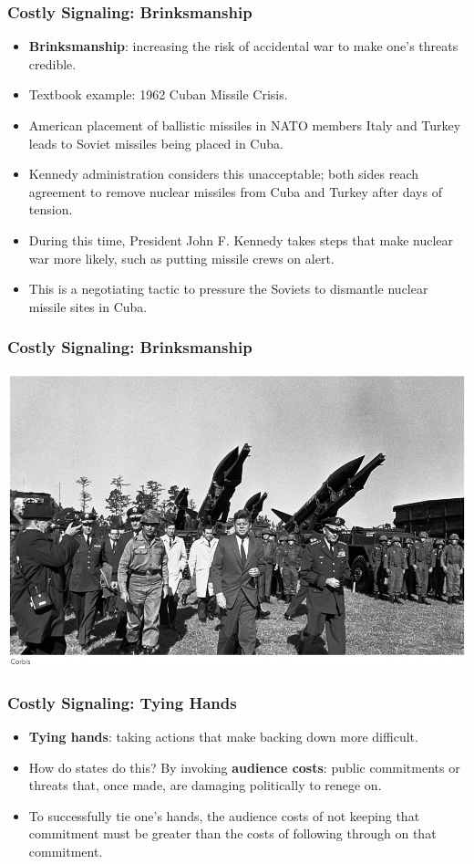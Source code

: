 \documentclass[handout]{beamer}
\begin{document}
\begin{frame} 
\frametitle{\LARGE{Costly Signaling: Brinksmanship}}
\begin{itemize}
	\item \textbf{Brinksmanship}: increasing the risk of accidental war to make one's threats credible. \pause 
	\item Textbook example: 1962 Cuban Missile Crisis. \pause
	\item American placement of ballistic missiles in NATO members Italy and Turkey leads to Soviet missiles being placed in Cuba. \pause
	\item Kennedy administration considers this unacceptable; both sides reach agreement to remove nuclear missiles from Cuba and Turkey after days of tension. \pause
	\item During this time, President John F. Kennedy takes steps that make nuclear war more likely, such as putting missile crews on alert. \pause
	\item This is a negotiating tactic to pressure the Soviets to dismantle nuclear missile sites in Cuba. 
\end{itemize}
\end{frame}

\begin{frame}
	\frametitle{\LARGE{Costly Signaling: Brinksmanship}}
	\centering
	\includegraphics[width=\textwidth,height=0.8\textheight,keepaspectratio]{Cubanmissilecrisis.jpg}
\end{frame}


\begin{frame} 
\frametitle{\LARGE{Costly Signaling: Tying Hands}}
\begin{itemize}
		\item \textbf{Tying hands}: taking actions that make backing down more difficult. \pause
		\item How do states do this? By invoking \textbf{audience costs}: public commitments or threats that, once made, are damaging politically to renege on. \pause
		\item To successfully tie one's hands, the audience costs of not keeping that commitment must be greater than the costs of following through on that commitment. 
\end{itemize}
\end{frame}
\end{document}
